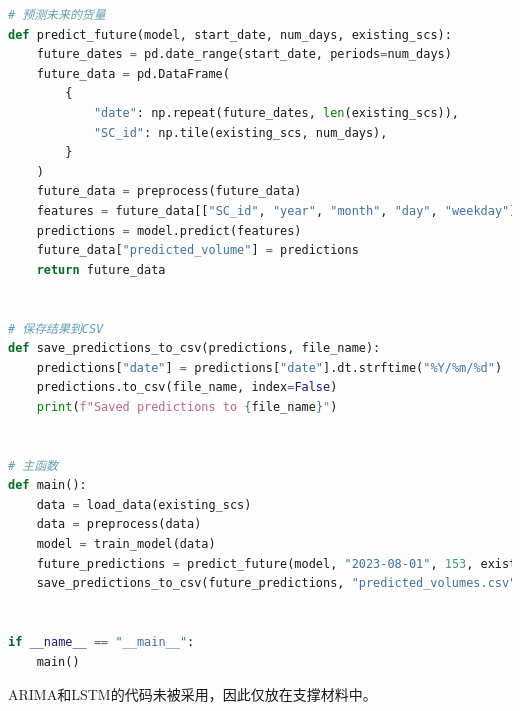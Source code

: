 \documentclass[UTF8]{article}%
\begin{document}
\begin{lstlisting}[language=python]
# 预测未来的货量
def predict_future(model, start_date, num_days, existing_scs):
    future_dates = pd.date_range(start_date, periods=num_days)
    future_data = pd.DataFrame(
        {
            "date": np.repeat(future_dates, len(existing_scs)),
            "SC_id": np.tile(existing_scs, num_days),
        }
    )
    future_data = preprocess(future_data)
    features = future_data[["SC_id", "year", "month", "day", "weekday"]]
    predictions = model.predict(features)
    future_data["predicted_volume"] = predictions
    return future_data


# 保存结果到CSV
def save_predictions_to_csv(predictions, file_name):
    predictions["date"] = predictions["date"].dt.strftime("%Y/%m/%d")
    predictions.to_csv(file_name, index=False)
    print(f"Saved predictions to {file_name}")


# 主函数
def main():
    data = load_data(existing_scs)
    data = preprocess(data)
    model = train_model(data)
    future_predictions = predict_future(model, "2023-08-01", 153, existing_scs)
    save_predictions_to_csv(future_predictions, "predicted_volumes.csv")


if __name__ == "__main__":
    main()
\end{lstlisting}
ARIMA和LSTM的代码未被采用，因此仅放在支撑材料中。
\end{document}
